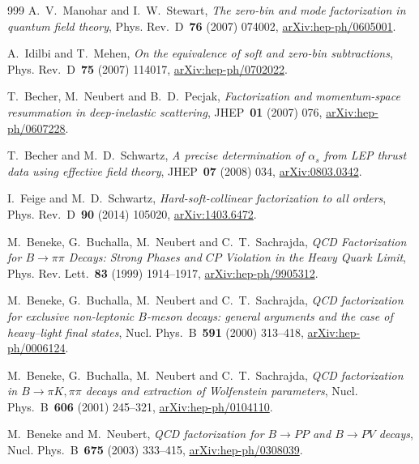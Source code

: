 \begin{thebibliography}{999}
A.~V.~Manohar and I.~W.~Stewart, \emph{The zero-bin and mode factorization in quantum field theory}, Phys. Rev.~D~\textbf{76} (2007) \mbox{074002}, \href{https://arxiv.org/abs/hep-ph/0605001}{arXiv:hep-ph/0605001}.

A.~Idilbi and T.~Mehen, \emph{On the equivalence of soft and zero-bin subtractions}, Phys. Rev.~D~\textbf{75} (2007) \mbox{114017}, \href{https://arxiv.org/abs/hep-ph/0702022}{arXiv:hep-ph/0702022}.

T.~Becher, M.~Neubert and B.~D.~Pecjak, \emph{Factorization and momentum-space resummation in deep-inelastic scattering}, JHEP~\textbf{01} (2007) \mbox{076}, \href{https://arxiv.org/abs/hep-ph/0607228}{arXiv:hep-ph/0607228}.

T.~Becher and M.~D.~Schwartz, \emph{A precise determination of $\alpha_s$ from LEP thrust data using effective field theory}, JHEP~\textbf{07} (2008) \mbox{034}, \href{https://arxiv.org/abs/0803.0342}{arXiv:0803.0342}.

I.~Feige and M.~D.~Schwartz, \emph{Hard-soft-collinear factorization to all orders}, Phys. Rev.~D~\textbf{90} (2014) \mbox{105020}, \href{https://arxiv.org/abs/1403.6472}{arXiv:1403.6472}.

M.~Beneke, G.~Buchalla, M.~Neubert and C.~T.~Sachrajda, \emph{QCD Factorization for $B\to\pi\pi$ Decays: Strong Phases and $CP$ Violation in the Heavy Quark Limit}, Phys. Rev. Lett.~\textbf{83} (1999) \mbox{1914--1917}, \href{https://arxiv.org/abs/hep-ph/9905312}{arXiv:hep-ph/9905312}.

M.~Beneke, G.~Buchalla, M.~Neubert and C.~T.~Sachrajda, \emph{QCD factorization for exclusive non-leptonic $B$-meson decays: general arguments and the case of heavy--light final states}, Nucl. Phys.~B~\textbf{591} (2000) \mbox{313--418}, \href{https://arxiv.org/abs/hep-ph/0006124}{arXiv:hep-ph/0006124}.

M.~Beneke, G.~Buchalla, M.~Neubert and C.~T.~Sachrajda, \emph{QCD factorization in $B\to\pi K,\pi\pi$ decays and extraction of Wolfenstein parameters}, Nucl. Phys.~B~\textbf{606} (2001) \mbox{245--321}, \href{https://arxiv.org/abs/hep-ph/0104110}{arXiv:hep-ph/0104110}.

M.~Beneke and M.~Neubert, \emph{QCD factorization for $B\to PP$ and $B\to PV$ decays}, Nucl. Phys.~B~\textbf{675} (2003) \mbox{333--415}, \href{https://arxiv.org/abs/hep-ph/0308039}{arXiv:hep-ph/0308039}.


\end{thebibliography}
